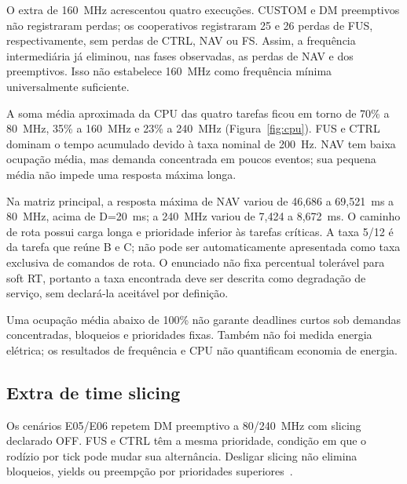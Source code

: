 O extra de 160~MHz acrescentou quatro execuções. CUSTOM e DM preemptivos não registraram perdas; os cooperativos registraram 25 e 26 perdas de FUS, respectivamente, sem perdas de CTRL, NAV ou FS. Assim, a frequência intermediária já eliminou, nas fases observadas, as perdas de NAV e dos preemptivos. Isso não estabelece 160~MHz como frequência mínima universalmente suficiente.


A soma média aproximada da CPU das quatro tarefas ficou em torno de 70\% a 80~MHz, 35\% a 160~MHz e 23\% a 240~MHz (Figura~\ref{fig:cpu}). FUS e CTRL dominam o tempo acumulado devido à taxa nominal de 200~Hz. NAV tem baixa ocupação média, mas demanda concentrada em poucos eventos; sua pequena média não impede uma resposta máxima longa.

Na matriz principal, a resposta máxima de NAV variou de 46,686 a 69,521~ms a 80~MHz, acima de D=20~ms; a 240~MHz variou de 7,424 a 8,672~ms. O caminho de rota possui carga longa e prioridade inferior às tarefas críticas. A taxa 5/12 é da tarefa que reúne B e C; não pode ser automaticamente apresentada como taxa exclusiva de comandos de rota. O enunciado não fixa percentual tolerável para soft RT, portanto a taxa encontrada deve ser descrita como degradação de serviço, sem declará-la aceitável por definição.


Uma ocupação média abaixo de 100\% não garante deadlines curtos sob demandas concentradas, bloqueios e prioridades fixas. Também não foi medida energia elétrica; os resultados de frequência e CPU não quantificam economia de energia.

\subsection{Extra de time slicing}

Os cenários E05/E06 repetem DM preemptivo a 80/240~MHz com slicing declarado OFF. FUS e CTRL têm a mesma prioridade, condição em que o rodízio por tick pode mudar sua alternância. Desligar slicing não elimina bloqueios, yields ou preempção por prioridades superiores~\cite{barry_freertos}.


